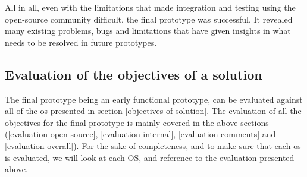 \documentclass[pdftex,10pt,b5paper,twoside]{report}
\begin{document}
All in all, even with the limitations that made integration and testing using the open-source community difficult, the final prototype was successful. It revealed many existing problems, bugs and limitations that have given insights in what needs to be resolved in future prototypes. 


\subsection{Evaluation of the objectives of a solution}
\label{evaluation-os-reference}
The final prototype being an early functional prototype, can be evaluated against all of the \gls{os} presented in section \ref{objectives-of-solution}. The evaluation of all the objectives for the final prototype is mainly covered in the above sections (\ref{evaluation-open-source}, \ref{evaluation-internal}, \ref{evaluation-comments} and \ref{evaluation-overall}). For the sake of completeness, and to make sure that each \gls{os} is evaluated, we will look at each OS, and reference to the evaluation presented above. 


\end{document}
